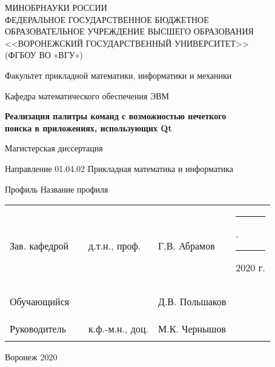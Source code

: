\newcommand{\disserDepartment}{математического обеспечения ЭВМ}
\newcommand{\disserProgram}{01.04.02 Прикладная математика и информатика}
\newcommand{\disserTitle}{Реализация палитры команд с возможностью нечеткого \\ поиска в
    приложениях, использующих Qt}
\newcommand{\disserProfile}{Название профиля}

\newcommand{\disserHeadOfDepStatus}{д.т.н., проф.}
\newcommand{\disserHeadOfDepName}{Г.В. Абрамов}
\newcommand{\disserStudent}{Д.В. Польшаков}

\newcommand{\disserSupervisorStatus}{к.ф.-м.н., доц.}
\newcommand{\disserSupervisorName}{М.К. Чернышов}

\thispagestyle{empty}
\begin{center}
МИНОБРНАУКИ РОССИИ \\
ФЕДЕРАЛЬНОЕ ГОСУДАРСТВЕННОЕ БЮДЖЕТНОЕ \\
ОБРАЗОВАТЕЛЬНОЕ УЧРЕЖДЕНИЕ ВЫСШЕГО ОБРАЗОВАНИЯ \\
<<ВОРОНЕЖСКИЙ ГОСУДАРСТВЕННЫЙ УНИВЕРСИТЕТ>> \\
(ФГБОУ ВО «ВГУ»)

\vspace{2ex}

Факультет прикладной математики, информатики и механики

\vspace{2ex}

Кафедра \disserDepartment{}

\vspace{3.5cm}
\textbf{\disserTitle}

\vspace{1.5cm}
Магистерская диссертация

\vspace{0.5cm}
Направление \disserProgram{}

\vspace{0.5cm}
Профиль \disserProfile{}

\vspace{5cm}

\begin{center}
  \begin{tabular}{ l l l l l }
    Зав. кафедрой & \rule{25mm}{0.1mm} & \disserHeadOfDepStatus{}  & \disserHeadOfDepName{} & \rule{7mm}{0.1mm}.\rule{7mm}{0.1mm} 2020 г.  \\
    & \\
    Обучающийся   & \rule{25mm}{0.1mm} &                           & \disserStudent{} & \\
    & \\
    Руководитель  & \rule{25mm}{0.1mm} & \disserSupervisorStatus{} & \disserSupervisorName{} & \\
  \end{tabular}
\end{center}

\vspace{3cm}
Воронеж 2020
\end{center}
